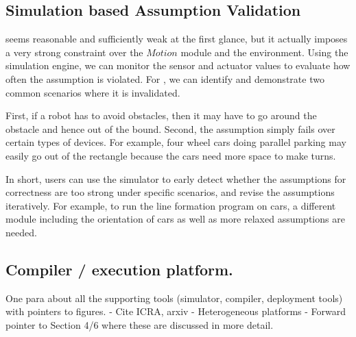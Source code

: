 \subsection{Simulation based Assumption Validation}

 seems reasonable and sufficiently weak at the first glance,
but it actually imposes a very strong constraint over the $Motion$ module and the environment.
Using the simulation engine, we can monitor the sensor and actuator values to evaluate how often the assumption is violated.
For , we can identify and demonstrate two common scenarios
where it is invalidated.


First, if a robot has to avoid obstacles,
then it may have to go around the obstacle and hence out of the bound.
Second, the assumption simply fails over certain types of devices.
For example, four wheel cars doing parallel parking may easily go out of the rectangle
because the cars need more space to make turns.

In short, users can use the simulator to early detect whether
the assumptions for correctness are too strong under specific scenarios,
and revise the assumptions iteratively.
For example, to run the line formation program on cars,
a different module including the orientation of cars as well as more relaxed assumptions are needed.

\subsection{Compiler / execution platform.}
One para about all the supporting tools (simulator, compiler, deployment tools) with pointers to figures.
- Cite ICRA, arxiv
- Heterogeneous platforms
- Forward pointer to Section 4/6 where these are discussed in more detail.
